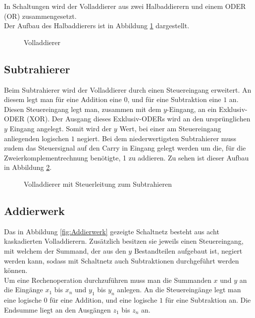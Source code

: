 \documentclass[a4paper,12pt,fleqn,oneside]{article}
\begin{document}
		\noindent
		In Schaltungen wird der Volladdierer aus zwei Halbaddierern und einem ODER (OR) zusammengesetzt.\\
		Der Aufbau des Halbaddierers ist in Abbildung \ref{fig:volladdierer} dargestellt.

		\begin{figure}[h]
			\center
			
			\caption{Volladdierer}
			\label{fig:volladdierer}
		\end{figure}

\newpage

	\subsection{Subtrahierer}
		Beim Subtrahierer wird der Volladdierer durch einen Steuereingang erweitert. An diesem legt man für eine Addition eine
		$0$, und für eine Subtraktion eine $1$ an. Diesen Steuereingang legt man, zusammen mit dem $y$-Eingang, an ein
		Exklusiv-ODER (XOR). Der Ausgang dieses Exklusiv-ODERs wird an den ursprünglichen $y$ Eingang angelegt. Somit wird
		der $y$ Wert, bei einer am Steuereingang anliegenden logischen $1$ negiert. Bei dem niederwertigsten Subtrahierer muss
		zudem das Steuersignal auf den Carry in Eingang gelegt werden um die, für die Zweierkomplementrechnung benötigte, 1
		zu addieren. Zu sehen ist dieser Aufbau in Abbildung \ref{fig:steuerbarer_volladdierer}.

		\begin{figure}[h]
			\center
			
			\caption{Volladdierer mit Steuerleitung zum Subtrahieren}
			\label{fig:steuerbarer_volladdierer}
		\end{figure}



\newpage

	\subsection{Addierwerk}
		Das in Abbildung \ref{fig:Addierwerk} gezeigte Schaltnetz besteht aus acht kaskadierten Volladdierern. Zusätzlich besitzen
		sie jeweils einen Steuereingang, mit welchem der Summand, der aus den $y$ Bestandteilen aufgebaut ist, negiert werden
		kann, sodass mit Schaltnetz auch Subtraktionen durchgeführt werden können.\\
		Um eine Rechenoperation durchzuführen muss man die Summanden $x$ und $y$ an die Eingänge $x_1$ bis $x_n$ und
		$y_1$ bis $y_n$ anlegen. An die Steuereingänge legt man eine logische $0$ für eine Addition, und eine logische $1$ für
		eine Subtraktion an. Die Endsumme liegt an den Ausgängen $z_1$ bis $z_n$ an.
\end{document}
